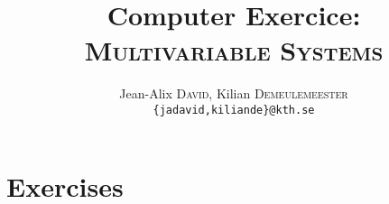 \documentclass[a4paper,8pt,twocolumn]{extarticle}
\title{Computer Exercice:\\ \textsc{Multivariable Systems}}
\author{Jean-Alix \textsc{David}, Kilian \textsc{Demeulemeester} \\ \texttt{\{jadavid,kiliande\}@kth.se}}
\begin{document}
\setlength\parindent{0em}

\maketitle




\section{Exercises}




% 


\end{document}
